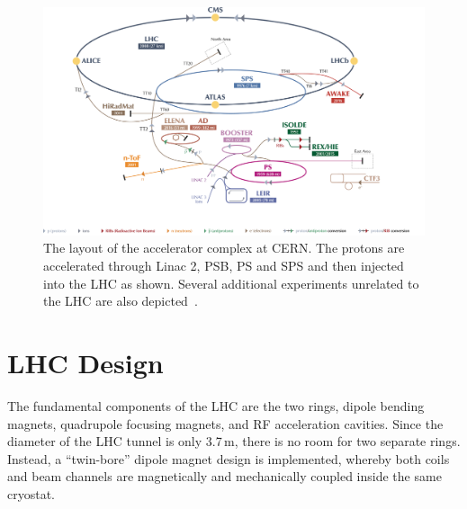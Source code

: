 \begin{figure}[tbp]
\begin{center}
\includegraphics[width=.8\textwidth]{figures/LHC/accelerator}
\end{center}
\caption[The LHC accelerator complex]{The layout of the accelerator complex at CERN. The protons are accelerated through Linac 2, PSB, PS and SPS and then injected into the LHC as shown. Several additional experiments unrelated to the LHC are also depicted~\cite{acc_comp}.}
\label{fig:lhc_acc_comp}
\end{figure}


%
\section{LHC Design}
\label{ch:lhc:des}
The fundamental components of the LHC are the two rings, dipole bending magnets, quadrupole focusing magnets, and RF acceleration cavities. Since the diameter of the LHC tunnel is only 3.7\,m, there is no room for two separate rings. Instead, a ``twin-bore'' dipole magnet design is implemented, whereby both coils and beam channels are magnetically and mechanically coupled inside the same cryostat. 

